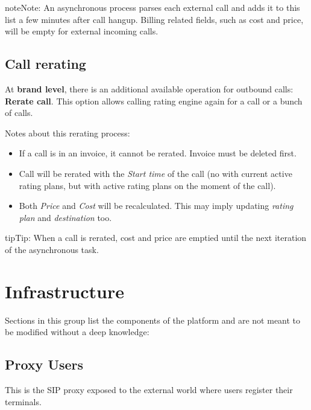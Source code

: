 \documentclass[letterpaper,10pt,english]{sphinxmanual}
\begin{document}
\begin{notice}{note}{Note:}
An asynchronous process parses each external call and adds it to this list a few minutes after call hangup. Billing related fields, such as cost and price, will be empty for external incoming calls.
\end{notice}


\subsection{Call rerating}
\label{administration_portal/platform/external_calls:call-rerating}
At \textbf{brand level}, there is an additional available operation for outbound calls: \textbf{Rerate call}. This option allows calling rating engine again for a call or a bunch of calls.

Notes about this rerating process:
\begin{itemize}
\item {} 
If a call is in an invoice, it cannot be rerated. Invoice must be deleted first.

\item {} 
Call will be rerated with the \emph{Start time} of the call (no with current active rating plans, but with active rating plans
on the moment of the call).

\item {} 
Both \emph{Price} and \emph{Cost} will be recalculated. This may imply updating \emph{rating plan} and \emph{destination} too.

\end{itemize}

\begin{notice}{tip}{Tip:}
When a call is rerated, cost and price are emptied until the next iteration of the asynchronous task.
\end{notice}


\section{Infrastructure}
\label{administration_portal/platform/infrastructure/index:infrastructure}\label{administration_portal/platform/infrastructure/index::doc}
Sections in this group list the components of the platform and are not meant to be modified without a deep knowledge:


\subsection{Proxy Users}
\label{administration_portal/platform/infrastructure/proxy_users:proxy-users}\label{administration_portal/platform/infrastructure/proxy_users:proxyusers}\label{administration_portal/platform/infrastructure/proxy_users::doc}
This is the SIP proxy exposed to the external world where users register their
terminals.
\end{document}
